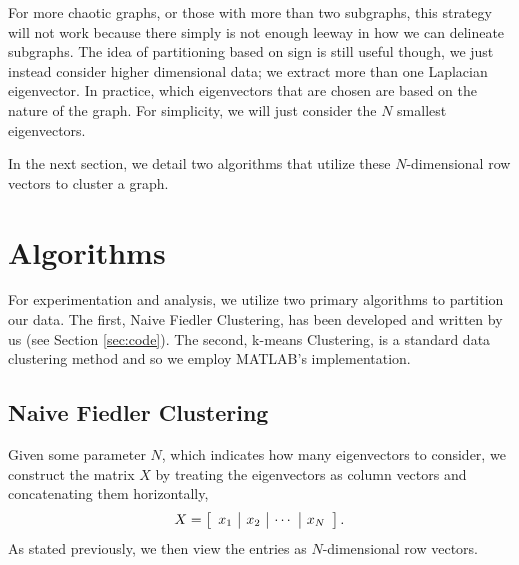 \documentclass[11pt, letterpaper]{article}
\theoremstyle{perchance}
\begin{document}
    For more chaotic graphs, or those with more than two subgraphs, this strategy will not work because there simply is not enough leeway in how we can delineate subgraphs. The idea of partitioning based on sign is still useful though, we just instead consider higher dimensional data; we extract more than one Laplacian eigenvector. In practice, which eigenvectors that are chosen are based on the nature of the graph. For simplicity, we will just consider the $N$ smallest eigenvectors.

    In the next section, we detail two algorithms that utilize these $N$-dimensional row vectors to cluster a graph.
    
\section{Algorithms}\label{sec:algo}

    For experimentation and analysis, we utilize two primary algorithms to partition our data. The first, Naive Fiedler Clustering, has been developed and written by us (see Section \ref{sec:code}). The second, k-means Clustering, is a standard data clustering method and so we employ MATLAB's implementation.

    \subsection{Naive Fiedler Clustering}

        Given some parameter $N$, which indicates how many eigenvectors to consider, we construct the matrix $X$ by treating the eigenvectors as column vectors and concatenating them horizontally,
        \[X = \left[\begin{array}{c | c | c | c } x_1 & x_2 & \cdots & x_N \end{array}\right].\]
        As stated previously, we then view the entries as $N$-dimensional row vectors.
        
\end{document}
